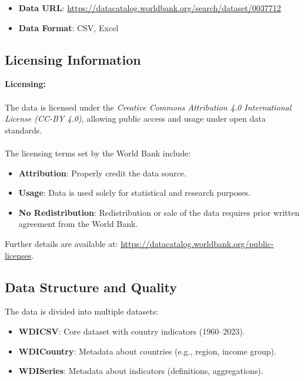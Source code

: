 \documentclass[a4paper,12pt]{article}
\begin{document}
\begin{itemize}[leftmargin=*,labelsep=5mm]
    \item \textbf{Data URL}: \url{https://datacatalog.worldbank.org/search/dataset/0037712}
    \item \textbf{Data Format}: CSV, Excel
\end{itemize}

\subsection{Licensing Information}

\textbf{Licensing:}
\\\\
The data is licensed under the \textit{Creative Commons Attribution 4.0 International License (CC-BY 4.0)}, allowing public access and usage under open data standards.
\\\\
The licensing terms set by the World Bank include:

\begin{itemize}[leftmargin=*,labelsep=5mm]
    \item \textbf{Attribution}: Properly credit the data source.
    \item \textbf{Usage}: Data is used solely for statistical and research purposes.
    \item \textbf{No Redistribution}: Redistribution or sale of the data requires prior written agreement from the World Bank.
\end{itemize}

Further details are available at: \url{https://datacatalog.worldbank.org/public-licenses}.

\subsection{Data Structure and Quality}

The data is divided into multiple datasets:

\begin{itemize}
    \item \textbf{WDICSV}: Core dataset with country indicators (1960--2023).
    \item \textbf{WDICountry}: Metadata about countries (e.g., region, income group).
    \item \textbf{WDISeries}: Metadata about indicators (definitions, aggregations).
\end{itemize}
\end{document}
